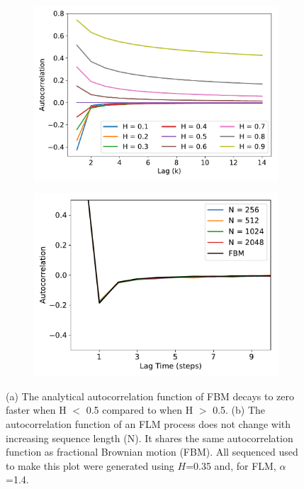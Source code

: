 \documentclass{article}
\begin{document}
  \begin{figure}
  \centering
  \begin{subfigure}{0.45\textwidth}
  \includegraphics[width=\textwidth]{hurst_autocorrelation.pdf}
  \caption{}\label{fig:hurst_autocorrelation}
  \end{subfigure}
  \begin{subfigure}{0.45\textwidth}
  \includegraphics[width=\textwidth]{flm_autocovariance.pdf}
  \caption{}\label{fig:flm_autocorrelation}
  \end{subfigure}
  \caption{(a) The analytical autocorrelation function of FBM decays to zero faster
  when H $<$ 0.5 compared to when H $>$ 0.5. (b) The autocorrelation function of an 
  FLM process does not change with increasing sequence length (N). It shares the same
  autocorrelation function as fractional Brownian motion (FBM). All sequenced used to
  make this plot were generated using $H$=0.35 and, for FLM, $\alpha$=1.4.}\label{fig:hurst_parameters}
  \end{figure}
  
\end{document}
